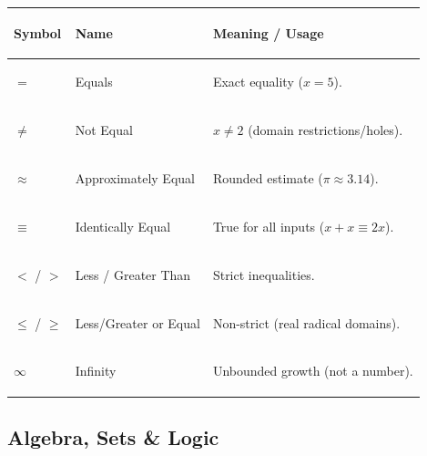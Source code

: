 \documentclass[11pt, letterpaper]{article}
\begin{document}
\noindent
{\renewcommand{\arraystretch}{1.5}
\begin{tabularx}{\textwidth}{>{\centering\arraybackslash}p{1.5cm}
                              >{\bfseries\raggedright\arraybackslash}p{3.5cm}
                              >{\raggedright\arraybackslash}X}
\toprule
\rowcolor{tableheaderpurple}
\textbf{Symbol} & \textbf{Name} & \textbf{Meaning / Usage} \\
\midrule
\rowcolor{rowPu} $=$ & Equals & Exact equality ($x = 5$). \\
\rowcolor{rowA}  $\neq$ & Not Equal & $x \neq 2$ (domain restrictions/holes). \\
\rowcolor{rowPu} $\approx$ & Approximately Equal & Rounded estimate ($\pi \approx 3.14$). \\
\rowcolor{rowA}  $\equiv$ & Identically Equal & True for all inputs ($x + x \equiv 2x$). \\
\rowcolor{rowPu} $<$ / $>$ & Less / Greater Than & Strict inequalities. \\
\rowcolor{rowA}  $\leq$ / $\geq$ & Less/Greater or Equal & Non-strict (real radical domains). \\
\rowcolor{rowPu} $\infty$ & Infinity & Unbounded growth (not a number). \\
\bottomrule
\end{tabularx}}

\subsection*{Algebra, Sets \& Logic}
\end{document}
